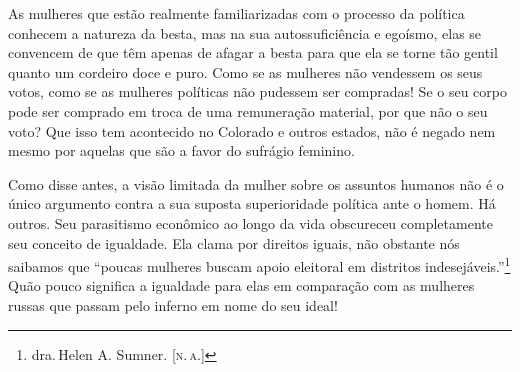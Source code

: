 As mulheres que estão realmente familiarizadas com o processo da
política conhecem a natureza da besta, mas na sua autossuficiência e
egoísmo, elas se convencem de que têm apenas de afagar a besta para que
ela se torne tão gentil quanto um cordeiro doce e puro. Como se as
mulheres não vendessem os seus votos, como se as mulheres políticas não
pudessem ser compradas! Se o seu corpo pode ser comprado em troca de uma
remuneração material, por que não o seu voto? Que isso tem acontecido no
Colorado e outros estados, não é negado nem mesmo por aquelas que são a
favor do sufrágio feminino.

Como disse antes, a visão limitada da mulher sobre os assuntos humanos
não é o único argumento contra a sua suposta superioridade política ante
o homem. Há outros. Seu parasitismo econômico ao longo da vida
obscureceu completamente seu conceito de igualdade. Ela clama por
direitos iguais, não obstante nós saibamos que ``poucas mulheres buscam
apoio eleitoral em distritos indesejáveis.''\footnote{dra.\,Helen A.
  Sumner. [\textsc{n.\,a.}]} Quão pouco significa a igualdade para elas em
comparação com as mulheres russas que passam pelo inferno em nome do seu
ideal!\label{russas}

